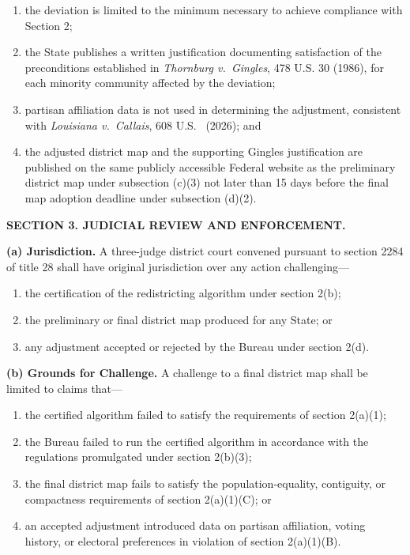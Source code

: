 \begin{enumerate}[label=(\arabic*)]
    \item the deviation is limited to the minimum necessary to achieve compliance with Section 2;
    \item the State publishes a written justification documenting satisfaction of the preconditions established in \textit{Thornburg v.\ Gingles}, 478 U.S. 30 (1986), for each minority community affected by the deviation;
    \item partisan affiliation data is not used in determining the adjustment, consistent with \textit{Louisiana v.\ Callais}, 608 U.S.\ \underline{\hspace{1em}} (2026); and
    \item the adjusted district map and the supporting Gingles justification are published on the same publicly accessible Federal website as the preliminary district map under subsection (c)(3) not later than 15 days before the final map adoption deadline under subsection (d)(2).
\end{enumerate}

\bigskip

\noindent\textbf{SECTION 3. JUDICIAL REVIEW AND ENFORCEMENT.}

\textbf{(a) Jurisdiction.} A three-judge district court convened pursuant to section 2284 of title 28 shall have original jurisdiction over any action challenging---

\begin{enumerate}[label=(\arabic*)]
    \item the certification of the redistricting algorithm under section 2(b);
    \item the preliminary or final district map produced for any State; or
    \item any adjustment accepted or rejected by the Bureau under section 2(d).
\end{enumerate}

\textbf{(b) Grounds for Challenge.} A challenge to a final district map shall be limited to claims that---

\begin{enumerate}[label=(\arabic*)]
    \item the certified algorithm failed to satisfy the requirements of section 2(a)(1);
    \item the Bureau failed to run the certified algorithm in accordance with the regulations promulgated under section 2(b)(3);
    \item the final district map fails to satisfy the population-equality, contiguity, or compactness requirements of section 2(a)(1)(C); or
    \item an accepted adjustment introduced data on partisan affiliation, voting history, or electoral preferences in violation of section 2(a)(1)(B).
\end{enumerate}

